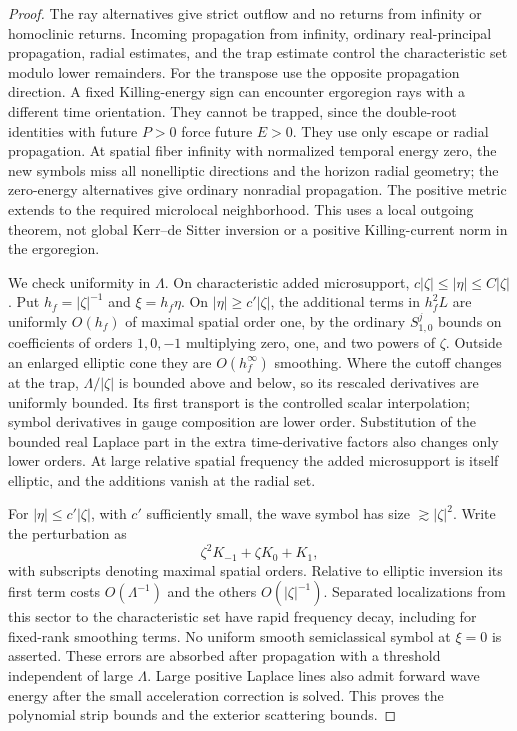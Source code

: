 \begin{proof}
The ray alternatives give strict outflow and no returns from
infinity or homoclinic returns.  Incoming propagation from infinity,
ordinary real-principal propagation, radial estimates, and the trap
estimate control the characteristic set modulo lower remainders.
For the transpose use the opposite propagation direction.
A fixed Killing-energy sign can encounter ergoregion rays with
a different time orientation.  They cannot be trapped, since
the double-root identities with future $P>0$ force future $E>0$.
They use only escape or radial propagation.  At spatial fiber
infinity with normalized temporal energy zero, the new symbols
miss all nonelliptic directions and the horizon radial geometry;
the zero-energy alternatives give ordinary nonradial propagation.
The positive metric extends to the required microlocal neighborhood.
This uses a local outgoing theorem, not global Kerr--de Sitter
inversion or a positive Killing-current norm in the ergoregion.

We check uniformity in $\Lambda$.  On characteristic added
microsupport, $c|\zeta|\leq|\eta|\leq C|\zeta|$.  Put
$h_f=|\zeta|^{-1}$ and $\xi=h_f\eta$.  On
$|\eta|\geq c'|\zeta|$, the additional terms in $h_f^2L$ are
uniformly $O(h_f)$ of maximal spatial order one, by the ordinary
$S^j_{1,0}$ bounds on coefficients of orders $1,0,-1$ multiplying
zero, one, and two powers of $\zeta$.  Outside an enlarged elliptic
cone they are $O(h_f^\infty)$ smoothing.  Where the cutoff changes
at the trap, $\Lambda/|\zeta|$ is bounded above and below, so its
rescaled derivatives are uniformly bounded.  Its first transport
is the controlled scalar interpolation; symbol derivatives in
gauge composition are lower order.  Substitution of the bounded
real Laplace part in the extra time-derivative factors also changes
only lower orders.  At large relative spatial frequency the
added microsupport is itself elliptic, and the additions vanish
at the radial set.

For $|\eta|\leq c'|\zeta|$, with $c'$ sufficiently small, the wave
symbol has size $\gtrsim|\zeta|^2$.  Write the perturbation as
\[
 \zeta^2K_{-1}+\zeta K_0+K_1,
\]
with subscripts denoting maximal spatial orders.  Relative to
elliptic inversion its first term costs $O(\Lambda^{-1})$ and
the others $O(|\zeta|^{-1})$.  Separated localizations from this
sector to the characteristic set have rapid frequency decay,
including for fixed-rank smoothing terms.  No uniform smooth
semiclassical symbol at $\xi=0$ is asserted.  These errors are
absorbed after propagation with a threshold independent of large
$\Lambda$.  Large positive Laplace lines also admit forward wave
energy after the small acceleration correction is solved.
This proves the polynomial strip bounds and the exterior
scattering bounds.


\end{proof}
